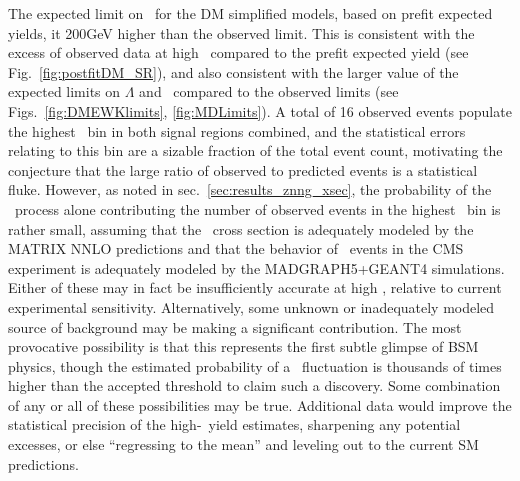 The expected limit on \mmed\ for the DM simplified models, based on prefit expected yields,
it 200\unit{GeV} higher than the observed limit. This is consistent with the excess of observed data at high \ETgamma\ compared to the prefit
expected yield (see Fig.~\ref{fig:postfitDM_SR}), and also consistent with the larger value of the expected limits on $\Lambda$ and \mD\ compared
to the observed limits (see Figs.~\ref{fig:DMEWKlimits}, \ref{fig:MDLimits}). A total of 16 observed events populate the highest \ETgamma\ bin
in both signal regions combined, and the statistical errors relating to this bin are a sizable fraction of the total event count, motivating the
conjecture that the large ratio of observed to predicted events is a statistical fluke. However, as noted in sec.~\ref{sec:results_znng_xsec}, the probability
of the \zinvg\ process alone contributing the number of observed events in the highest \ETgamma\ bin is rather small, assuming that the \zinvg\ cross
section is adequately modeled by the MATRIX NNLO predictions and that the behavior of \zinvg\ events in the CMS experiment is adequately modeled
by the MADGRAPH5+GEANT4 simulations. Either of these may in fact be insufficiently accurate at high \pTgamma, relative to current experimental
sensitivity. Alternatively, some unknown or inadequately modeled source of background may be making a significant contribution. The most
provocative possibility is that this represents the first subtle glimpse of BSM physics, though the estimated probability of a \zinvg\ fluctuation
is thousands of times higher than the accepted threshold to claim such a discovery. Some combination of any or all of these possibilities may be true.
Additional data would improve the statistical precision of the high-\ETgamma\ yield estimates, sharpening any potential excesses, or else
``regressing to the mean'' and leveling out to the current SM predictions.

